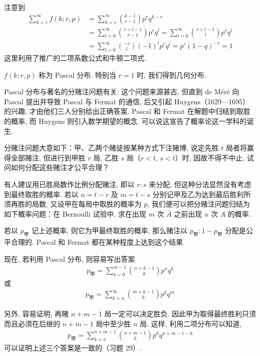 \documentclass[../../main.tex]{subfiles}
\begin{document}
注意到
\begin{align*}
\sum_{k=r}^{\infty} f(k;r,p)&=\sum_{k=r}^{\infty}\binom{k-1}{r-1}p^r q^{k-r}\\
&=\sum_{l=0}^{\infty}\binom{r+l-1}{r-1}p^r q^l=\sum_{l=0}^{\infty}\binom{r+l-1}{l}p^r q^l\\
&=\sum_{l=0}^{\infty}\binom{-r}{l}(-1)^l p^r q^l=p^r(1-q)^{-r}=1
\end{align*}
这里利用了推广的二项系数公式和牛顿二项式.

$f(k;r,p)$ 称为 Pascal 分布. 特别当 $r=1$ 时, 我们得到几何分布.

Pascal 分布与著名的分赌注问题有关. 这个问题来源甚古, 但直到 de Méré 向 Pascal 提出并导致 Pascal 与 Fermat 的通信, 后又引起 Huygens（1629—1695）的兴趣, 才由他们三人分别给出正确答案. Pascal 和 Fermat 在解题中归结到取胜的概率, 而 Huygens 则引入数学期望的概念. 可以说这宣告了概率论这一学科的诞生.

分赌注问题大意如下：甲、乙两个赌徒按某种方式下注赌博, 说定先胜 $t$ 局者将赢得全部赌注, 但进行到甲胜 $r$ 局, 乙胜 $s$ 局（$r<t$, $s<t$）时, 因故不得不中止, 试问如何分配这些赌注才公平合理？

有人建议用已胜局数作比例分配赌注, 即以 $r:s$ 来分配, 但这种分法显然没有考虑到最终取胜的概率. 若以 $n=t-r$ 及 $m=t-s$ 分别记甲及乙为达到最后胜利所须再胜的局数, 又设甲在每局中取胜的概率为 $p$, 我们便可以把分赌注问题归结为如下概率问题：在 Bernoulli 试验中, 求在出现 $m$ 次 $\bar{A}$ 之前出现 $n$ 次 $A$ 的概率.

若以 $p_{\text{甲}}$ 记上述概率, 则它为甲最终取胜的概率, 那么赌注以 $p_{\text{甲}}:1-p_{\text{甲}}$ 分配是公平合理的. Pascal 和 Fermat 都在某种程度上达到这个结果.

现在, 若利用 Pascal 分布, 则容易写出答案
\begin{align}\label{align:ch02-分赌注答案1}
p_{\text{甲}}=\sum_{k=0}^{m-1}\binom{n+k-1}{k}p^n q^k
\end{align}
或
\begin{align}\label{align:ch02-分赌注答案2}
p_{\text{甲}}=\sum_{k=n}^{\infty}\binom{m+k-1}{k}p^k q^m
\end{align}

另外, 容易证明, 再赌 $n+m-1$ 局一定可以决定胜负. 因此甲为取得最终胜利只须而且必须在后继的 $n+m-1$ 局中至少胜 $n$ 局. 这样, 利用二项分布可以知道,
\begin{align}\label{align:ch02-分赌注答案3}
p_{\text{甲}}=\sum_{k=n}^{n+m-1}\binom{n+m-1}{k}p^k q^{n+m-1-k}
\end{align}
可以证明上述三个答案是一致的（习题 29）.
\end{document}
